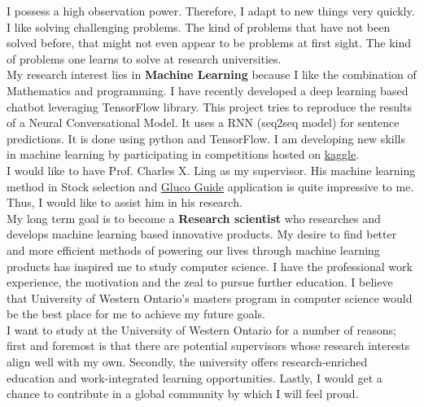 \documentclass{article}
\begin{document}
I possess a high observation power. Therefore, I adapt to new things very quickly. I like solving challenging problems. The kind of problems that have not been solved before, that might not even appear to be problems at first sight. The kind of problems one learns to solve at research universities.\\

My research interest lies in \textbf{Machine Learning} because I like the combination of Mathematics and programming. I have recently developed a deep learning based chatbot leveraging TensorFlow library. This project tries to reproduce the results of a Neural Conversational Model. It uses a RNN (seq2seq model) for sentence predictions. It is done using python and TensorFlow. I am developing new skills in machine learning by participating in competitions hosted on \href{https://www.kaggle.com/}{kaggle}.\\

I would like to have Prof. Charles X. Ling as my supervisor. His machine learning method in Stock selection and \href{https://glucoguide.com/}{Gluco Guide} application is quite impressive to me. Thus, I would like to assist him in his research.\\

My long term goal is to become a \textbf{Research scientist} who researches and develops machine learning based innovative products. My desire to find better and more efficient methods of powering our lives through machine learning products has inspired me to study computer science. I have the professional work experience, the motivation and the zeal to pursue further education. I believe that University of Western Ontario’s masters program in computer science would be the best place for me to achieve my future goals.\\

I want to study at the University of Western Ontario for a number of reasons; first and foremost is that there are potential supervisors whose research interests align well with my own. Secondly, the university offers research-enriched education and work-integrated learning opportunities.  Lastly, I would get a chance to contribute in a global community by which I will feel proud.\\


  
\end{document}
